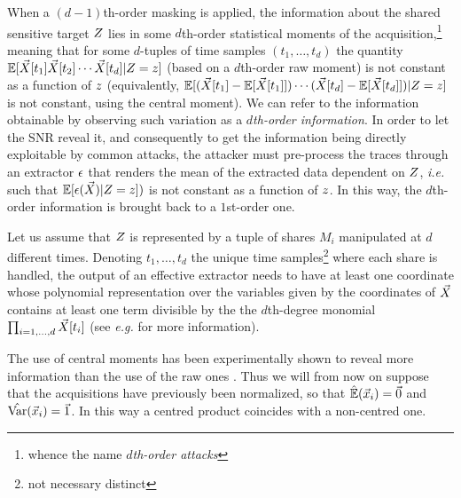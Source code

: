 When a $(d-1)$th-order masking is applied, the information about the shared sensitive target $Z$ lies in some $d$th-order statistical moments of the acquisition,\footnote{whence the name {\em $d$th-order attacks}} meaning that for some $d$-tuples of time samples $(t_1,\dots ,t_d)$ the quantity $\mathbb{E}[\vec{X}[t_1]\vec{X}[t_2]\cdots \vec{X}[t_d]\vert Z=z]$ (based on a $d$th-order raw moment) is not constant as a function of $z$ (equivalently, $ \mathbb{E}[(\vec{X}[t_1]-\mathbb{E}[\vec{X}[t_1]])\cdots (\vec{X}[t_d]-\mathbb{E}[\vec{X}[t_d]])\vert Z=z]$ is not constant, using the central moment). We can refer to the information obtainable by observing such variation as a {\em $d$th-order information}.
In order to let the SNR reveal it, and consequently to get the information being directly exploitable by common attacks, the attacker must pre-process the traces through an extractor $\epsilon$ that renders the mean of the extracted data dependent on $Z$, \emph{i.e.} such that $\mathbb{E}[\epsilon(\vec{X})\vert Z=z])$ is not constant as a function of $z$. In this way, the $d$th-order information is brought back to a $1$st-order one.

\begin{property}\label{property:poly}
Let us assume that $Z$ is represented by a tuple of shares $M_i$ manipulated at $d$ different times. Denoting $t_1,\dots,t_d$ the unique time samples\footnote{not necessary distinct} where each share is handled, the output of an effective extractor needs to have at least one coordinate whose polynomial representation over the variables given by the coordinates of $\vec{X}$ contains at least one term divisible by the the $d$th-degree monomial $\prod_{i=1,\dots,d}\vec{X}[t_i]$ (see \emph{e.g.} \cite{carlet2014achieving} for more information).
\end{property}


\begin{remark}\label{remark:normalized}
The use of central moments has been experimentally shown to reveal more information than the use of the raw ones \cite{chari1999towards,DBLP:journals/tc/ProuffRB09}. Thus we will from now on suppose that the acquisitions have previously been normalized, so that $\hat{\mathbb{E}}(\vec{x}_i) = \vec{0}$ and $\hat{\mathrm{Var}}(\vec{x}_i) = \vec{1}$. In this way a centred product coincides with a non-centred one. 
\end{remark}

